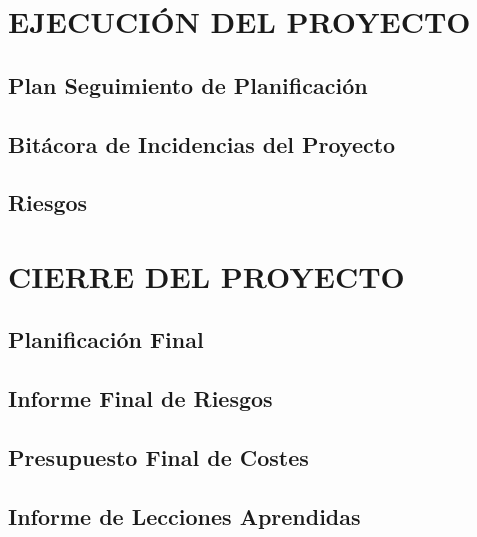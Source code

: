 \newpage
\section{EJECUCIÓN DEL PROYECTO}

\subsection{Plan Seguimiento de Planificación}

\subsection{Bitácora de Incidencias del Proyecto}

\subsection{Riesgos}


\newpage
\section{CIERRE DEL PROYECTO}

\subsection{Planificación Final}

\subsection{Informe Final de Riesgos}

\subsection{Presupuesto Final de Costes}

\subsection{Informe de Lecciones Aprendidas}

